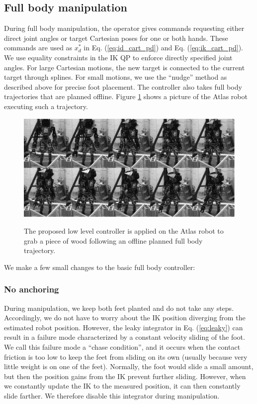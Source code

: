 \documentclass{ws-ijhr}
\newcommand{\eref}[1] {Eq. (\ref{#1})}
\newcommand{\fref}[1] {Figure \ref{#1}}
\begin{document}
\subsection{Full body manipulation}
During full body manipulation, the operator gives commands requesting either 
direct joint angles or target Cartesian poses for one or both hands. 
These commands are used as $x^*_d$ in \eref{eq:id_cart_pd} and \eref{eq:ik_cart_pd}.
We use equality constraints in the IK QP to enforce 
directly specified joint angles. 
For large Cartesian motions, the new target is connected to the current target
through splines. 
For small motions, we use the ``nudge'' method as described above for precise 
foot placement.
The controller also takes full body trajectories that are planned offline.
\fref{fig:manip} shows a picture of the Atlas robot executing such a trajectory.

\begin{figure} 
  \begin{center}
    {\includegraphics[width=1\textwidth]{images/debris.eps}}
    \caption{The proposed low level controller is applied on the Atlas robot 
      to grab a piece of wood following an offline planned full body trajectory.}
			\label{fig:manip}
  \end{center}
\end{figure}  
 
We make a few small changes to the basic full body controller:
\subsubsection{No anchoring}
During manipulation, we keep both feet planted and do not take any steps. 
Accordingly, we do not have to worry about the IK position diverging from the 
estimated robot position. However, the leaky integrator in \eref{eq:leaky} 
can result in a failure mode characterized by a constant velocity sliding of 
the foot. We call this failure mode a ``chase condition'', and it occurs when 
the contact friction is too low to keep the feet from sliding on its own 
(usually because very little weight is on one of the feet). Normally, the 
foot would slide a small amount, but then the position gains from the IK 
prevent further sliding. However, when we constantly update the IK to the 
measured position, it can then constantly slide farther. We therefore 
disable this integrator during manipulation.
\label{sec:chase_condition}
\end{document}
